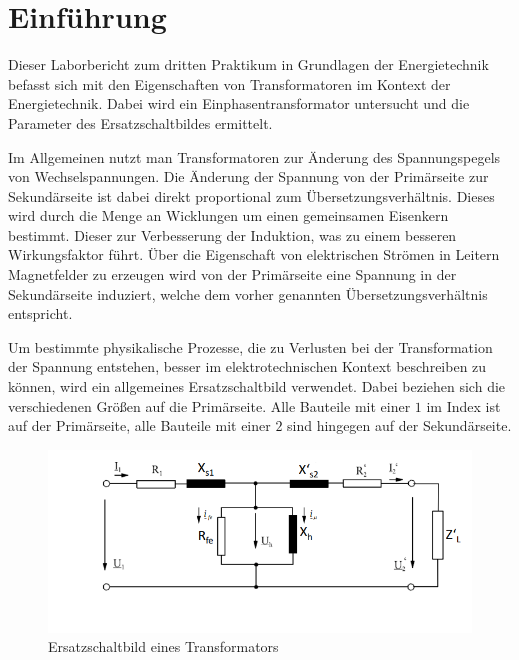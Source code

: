\documentclass{article}
\begin{document}
\newpage


\tableofcontents

\listoffigures

\listoftables


\newpage

\section{Einführung}

Dieser Laborbericht zum dritten Praktikum in Grundlagen der Energietechnik befasst sich  mit den Eigenschaften von Transformatoren im Kontext der Energietechnik. Dabei wird ein Einphasentransformator untersucht und die Parameter des Ersatzschaltbildes ermittelt.

Im Allgemeinen nutzt man Transformatoren zur Änderung des Spannungspegels von Wechselspannungen. Die Änderung der Spannung von der Primärseite zur Sekundärseite ist dabei direkt proportional zum Übersetzungsverhältnis. Dieses wird durch die Menge an Wicklungen um einen gemeinsamen Eisenkern bestimmt. Dieser zur Verbesserung der Induktion, was zu einem besseren Wirkungsfaktor führt. Über die Eigenschaft von elektrischen Strömen in Leitern Magnetfelder zu erzeugen wird von der Primärseite eine Spannung in der Sekundärseite induziert, welche dem vorher genannten Übersetzungsverhältnis entspricht.

Um bestimmte physikalische Prozesse, die zu Verlusten bei der Transformation der Spannung entstehen, besser im elektrotechnischen Kontext beschreiben zu können, wird ein allgemeines Ersatzschaltbild verwendet. Dabei beziehen sich die verschiedenen Größen auf die Primärseite. Alle Bauteile mit einer $1$ im Index ist auf der Primärseite, alle Bauteile mit einer $2$ sind hingegen auf der Sekundärseite.

\begin{figure}[h]
  \centering
  \includegraphics[width=\textwidth]{../assets/images/gep3/esb.png}
  \caption{Ersatzschaltbild eines Transformators}
  \label{fig:esbtrafo}
\end{figure}
\end{document}
